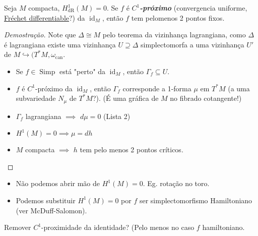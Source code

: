 \begin{prop}
	Seja $M$ compacta, $H^{1}_{\operatorname{dR}}(M)=0$. Se $f$ \'e  \textit{\textbf{$C^1$-pr\'oximo}} (convergencia uniforme, \href{https://en.wikipedia.org/wiki/Compact-open_topology#Fr%C3%A9chet_differentiable_functions}{Fr\'echet differentiable}?) da $\operatorname{id}_M$, ent\~ao $f$ tem pelomenos 2 pontos fixos.
\end{prop}

\begin{proof}[Demostra\c c\~ao]
	 Note que $\Delta \cong M$ pelo teorema da vizinhança lagrangiana, como $\Delta$ \'e lagrangiana existe uma vizinhança $U\supseteq \Delta$ simplectomorfa a uma vizinhança $U'$ de  $M\hookrightarrow (T^* M,\omega_{\operatorname{can}}$.

	 \begin{itemize}
	 \item Se $f\in\operatorname{Simp}$ est\'a "perto" da $\operatorname{id}_M$, ent\~ao $\Gamma_f\subseteq U$.

	\item $f$ \'e $C^1$-pr\'oximo da $\operatorname{id}_M$, ent\~ao $\Gamma_f$ corresponde a 1-forma $\mu$ em $T^*M$ (a uma subvariedade $N_\mu$ de  $T^*M$?). (\'E uma gr\'afica de $M$ no fibrado cotangente!)

	\item $\Gamma_f$ lagrangiana  $\implies $ $d\mu=0$ (Lista 2)

	 \item $H^{1}(M)=0\implies \mu=dh$
	
	\item $M$ compacta $\implies $ $h$ tem pelo menos 2 pontos cr\'iticos.
	 \end{itemize}
\end{proof}

\begin{remark}\leavevmode 
	\begin{itemize}
	\item N\~ao podemos abrir m\~ao de $H^{1}(M)=0$. Eg. rota\c c\~ao no toro.

	\item Podemos substituir $H^{1}(M)=0$ por $f$ ser simplectomorfismo Hamiltoniano (ver McDuff-Salomon).
	\end{itemize}
\end{remark}

\begin{question}
	Remover $C^1$-proximidade da identidade? (Pelo menos no caso $f$ hamiltoniano.
\end{question}

